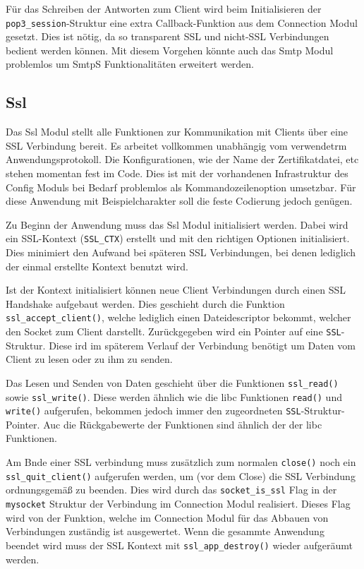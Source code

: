 \documentclass[final,a4paper,11pt,notitlepage,halfparskip]{scrreprt}
\begin{document}
Für das Schreiben der Antworten zum Client wird beim Initialisieren der
\texttt{pop3\_session}-Struktur eine extra Callback-Funktion aus dem Connection
Modul gesetzt. Dies ist nötig, da so transparent SSL und nicht-SSL Verbindungen
bedient werden können. Mit diesem Vorgehen könnte auch das Smtp Modul problemlos
um SmtpS Funktionalitäten erweitert werden.

\subsection{Ssl}
Das Ssl Modul stellt alle Funktionen zur Kommunikation mit Clients über eine SSL
Verbindung bereit. Es arbeitet vollkommen unabhängig vom verwendetrm
Anwendungsprotokoll. Die Konfigurationen, wie der Name der Zertifikatdatei, etc
stehen momentan fest im Code. Dies ist mit der vorhandenen Infrastruktur des
Config Moduls bei Bedarf problemlos als Kommandozeilenoption umsetzbar. Für
diese Anwendung mit Beispielcharakter soll die feste Codierung jedoch genügen.

Zu Beginn der Anwendung muss das Ssl Modul initialisiert werden. Dabei wird ein
SSL-Kontext (\texttt{SSL\_CTX}) erstellt und mit den richtigen Optionen
initialisiert. Dies minimiert den Aufwand bei späteren SSL Verbindungen, bei
denen lediglich der einmal erstellte Kontext benutzt wird.

Ist der Kontext initialisiert können neue Client Verbindungen durch einen SSL
Handshake aufgebaut werden. Dies geschieht durch die Funktion
\texttt{ssl\_accept\_client()}, welche lediglich einen Dateidescriptor bekommt,
welcher den Socket zum Client darstellt. Zurückgegeben wird ein Pointer auf eine
\texttt{SSL}-Struktur. Diese ird im späterem Verlauf der Verbindung benötigt um
Daten vom Client zu lesen oder zu ihm zu senden.

Das Lesen und Senden von Daten geschieht über die Funktionen \texttt{ssl\_read()}
sowie \texttt{ssl\_write()}. Diese werden ähnlich wie die libc Funktionen
\texttt{read()} und \texttt{write()} aufgerufen, bekommen jedoch immer den
zugeordneten \texttt{SSL}-Struktur-Pointer. Auc die Rückgabewerte der Funktionen
sind ähnlich der der libc Funktionen.

Am Bnde einer SSL verbindung muss zusätzlich zum normalen \texttt{close()} noch
ein \\
\texttt{ssl\_quit\_client()} aufgerufen werden, um (vor dem Close) die SSL
Verbindung ordnungsgemäß zu beenden. Dies wird durch das 
\texttt{socket\_is\_ssl} Flag in der \texttt{mysocket} Struktur der Verbindung
im Connection Modul realisiert. Dieses Flag wird von der Funktion, welche im
Connection Modul für das Abbauen von Verbindungen zuständig ist ausgewertet.
Wenn die gesammte Anwendung beendet wird muss der SSL Kontext mit
\texttt{ssl\_app\_destroy()} wieder aufgeräumt werden. 
\end{document}
